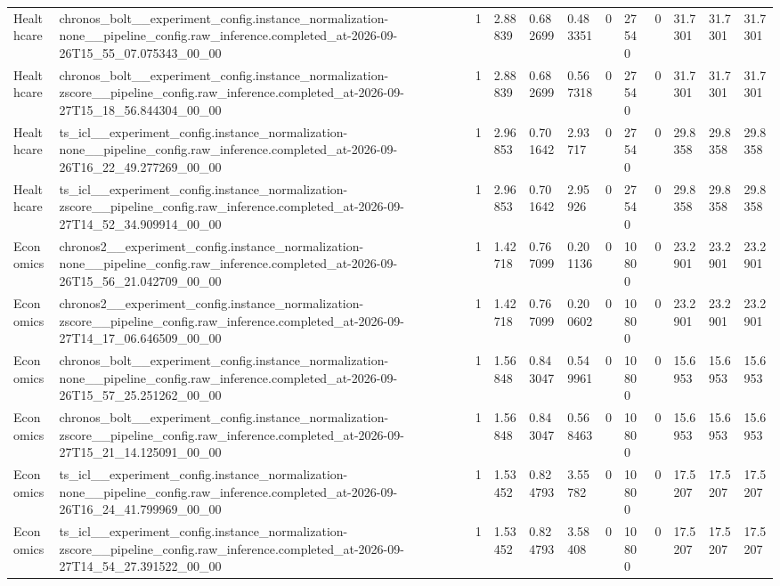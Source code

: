 \begin{tabular}{llllllllllll}
Healthcare & chronos\_bolt\_\_experiment\_config.instance\_normalization-none\_\_pipeline\_config.raw\_inference.completed\_at-2026-09-26T15\_55\_07.075343\_00\_00 & 1 & 2.88839 & 0.682699 & 0.483351 & 0 & 27540 & 0 & 31.7301 & 31.7301 & 31.7301 \\
Healthcare & chronos\_bolt\_\_experiment\_config.instance\_normalization-zscore\_\_pipeline\_config.raw\_inference.completed\_at-2026-09-27T15\_18\_56.844304\_00\_00 & 1 & 2.88839 & 0.682699 & 0.567318 & 0 & 27540 & 0 & 31.7301 & 31.7301 & 31.7301 \\
Healthcare & ts\_icl\_\_experiment\_config.instance\_normalization-none\_\_pipeline\_config.raw\_inference.completed\_at-2026-09-26T16\_22\_49.277269\_00\_00 & 1 & 2.96853 & 0.701642 & 2.93717 & 0 & 27540 & 0 & 29.8358 & 29.8358 & 29.8358 \\
Healthcare & ts\_icl\_\_experiment\_config.instance\_normalization-zscore\_\_pipeline\_config.raw\_inference.completed\_at-2026-09-27T14\_52\_34.909914\_00\_00 & 1 & 2.96853 & 0.701642 & 2.95926 & 0 & 27540 & 0 & 29.8358 & 29.8358 & 29.8358 \\
Economics & chronos2\_\_experiment\_config.instance\_normalization-none\_\_pipeline\_config.raw\_inference.completed\_at-2026-09-26T15\_56\_21.042709\_00\_00 & 1 & 1.42718 & 0.767099 & 0.201136 & 0 & 10800 & 0 & 23.2901 & 23.2901 & 23.2901 \\
Economics & chronos2\_\_experiment\_config.instance\_normalization-zscore\_\_pipeline\_config.raw\_inference.completed\_at-2026-09-27T14\_17\_06.646509\_00\_00 & 1 & 1.42718 & 0.767099 & 0.200602 & 0 & 10800 & 0 & 23.2901 & 23.2901 & 23.2901 \\
Economics & chronos\_bolt\_\_experiment\_config.instance\_normalization-none\_\_pipeline\_config.raw\_inference.completed\_at-2026-09-26T15\_57\_25.251262\_00\_00 & 1 & 1.56848 & 0.843047 & 0.549961 & 0 & 10800 & 0 & 15.6953 & 15.6953 & 15.6953 \\
Economics & chronos\_bolt\_\_experiment\_config.instance\_normalization-zscore\_\_pipeline\_config.raw\_inference.completed\_at-2026-09-27T15\_21\_14.125091\_00\_00 & 1 & 1.56848 & 0.843047 & 0.568463 & 0 & 10800 & 0 & 15.6953 & 15.6953 & 15.6953 \\
Economics & ts\_icl\_\_experiment\_config.instance\_normalization-none\_\_pipeline\_config.raw\_inference.completed\_at-2026-09-26T16\_24\_41.799969\_00\_00 & 1 & 1.53452 & 0.824793 & 3.55782 & 0 & 10800 & 0 & 17.5207 & 17.5207 & 17.5207 \\
Economics & ts\_icl\_\_experiment\_config.instance\_normalization-zscore\_\_pipeline\_config.raw\_inference.completed\_at-2026-09-27T14\_54\_27.391522\_00\_00 & 1 & 1.53452 & 0.824793 & 3.58408 & 0 & 10800 & 0 & 17.5207 & 17.5207 & 17.5207 \\

\end{tabular}
